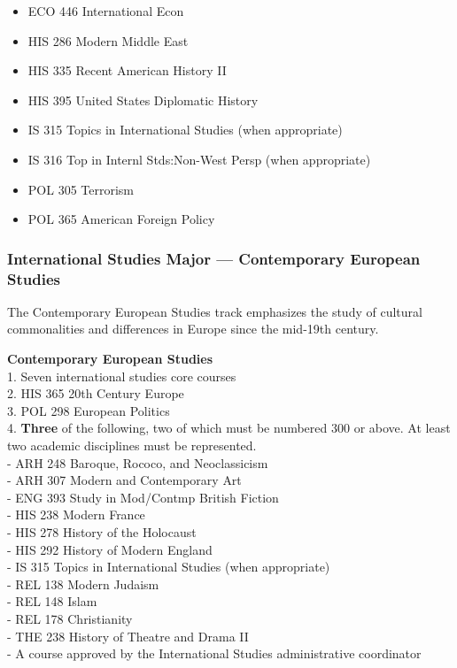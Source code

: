 \documentclass[
  letterpaper,
]{scrbook}
\providecommand{\tightlist}{%
  \setlength{\itemsep}{0pt}\setlength{\parskip}{0pt}}
\begin{document}
\begin{enumerate}
\begin{enumerate}
    \begin{itemize}
    \tightlist
    \item
      ECO 446 International Econ\\
    \item
      HIS 286 Modern Middle East\\
    \item
      HIS 335 Recent American History II\\
    \item
      HIS 395 United States Diplomatic History\\
    \item
      IS 315 Topics in International Studies (when appropriate)\\
    \item
      IS 316 Top in Internl Stds:Non-West Persp (when appropriate)\\
    \item
      POL 305 Terrorism\\
    \item
      POL 365 American Foreign Policy
    \end{itemize}
  \end{enumerate}
\end{enumerate}

\subsubsection{International Studies Major --- Contemporary European
Studies}\label{international-studies-major-contemporary-european-studies}

The Contemporary European Studies track emphasizes the study of cultural
commonalities and differences in Europe since the mid-19th century.

\textbf{Contemporary European Studies}\\
1. Seven international studies core courses\\
2. HIS 365 20th Century Europe\\
3. POL 298 European Politics\\
4. \textbf{Three} of the following, two of which must be numbered 300 or
above. At least two academic disciplines must be represented.\\
- ARH 248 Baroque, Rococo, and Neoclassicism\\
- ARH 307 Modern and Contemporary Art\\
- ENG 393 Study in Mod/Contmp British Fiction\\
- HIS 238 Modern France\\
- HIS 278 History of the Holocaust\\
- HIS 292 History of Modern England\\
- IS 315 Topics in International Studies (when appropriate)\\
- REL 138 Modern Judaism\\
- REL 148 Islam\\
- REL 178 Christianity\\
- THE 238 History of Theatre and Drama II\\
- A course approved by the International Studies administrative
coordinator
\end{document}
